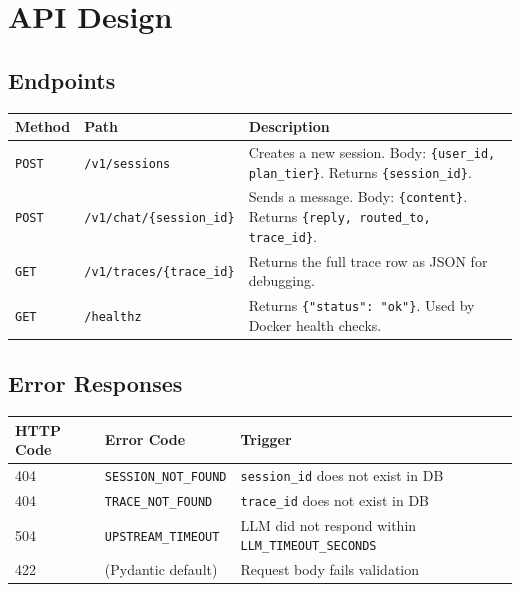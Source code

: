 \documentclass[12pt,a4paper]{article}
\begin{document}
\section{API Design}

\subsection{Endpoints}

\begin{center}
\begin{tabularx}{\textwidth}{llX}
\toprule
\textbf{Method} & \textbf{Path} & \textbf{Description} \\
\midrule
\texttt{POST} & \texttt{/v1/sessions} & Creates a new session. Body: \texttt{\{user\_id, plan\_tier\}}. Returns \texttt{\{session\_id\}}. \\
\texttt{POST} & \texttt{/v1/chat/\{session\_id\}} & Sends a message. Body: \texttt{\{content\}}. Returns \texttt{\{reply, routed\_to, trace\_id\}}. \\
\texttt{GET} & \texttt{/v1/traces/\{trace\_id\}} & Returns the full trace row as JSON for debugging. \\
\texttt{GET} & \texttt{/healthz} & Returns \texttt{\{"status": "ok"\}}. Used by Docker health checks. \\
\bottomrule
\end{tabularx}
\end{center}

\subsection{Error Responses}

\begin{center}
\begin{tabular}{lll}
\toprule
\textbf{HTTP Code} & \textbf{Error Code} & \textbf{Trigger} \\
\midrule
404 & \texttt{SESSION\_NOT\_FOUND} & \texttt{session\_id} does not exist in DB \\
404 & \texttt{TRACE\_NOT\_FOUND} & \texttt{trace\_id} does not exist in DB \\
504 & \texttt{UPSTREAM\_TIMEOUT} & LLM did not respond within \texttt{LLM\_TIMEOUT\_SECONDS} \\
422 & (Pydantic default) & Request body fails validation \\
\bottomrule
\end{tabular}
\end{center}
\end{document}
